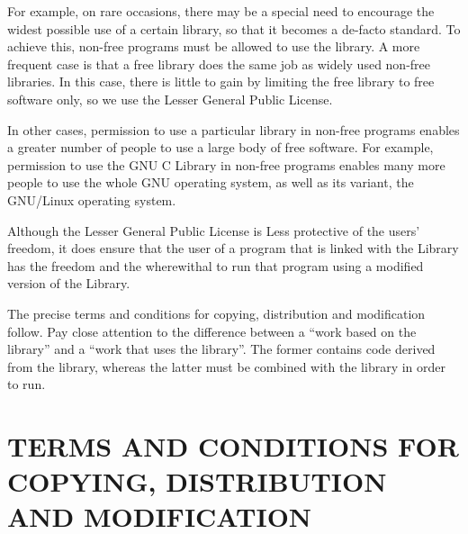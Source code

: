   For example, on rare occasions, there may be a special need to
encourage the widest possible use of a certain library, so that it becomes
a de-facto standard.  To achieve this, non-free programs must be
allowed to use the library.  A more frequent case is that a free
library does the same job as widely used non-free libraries.  In this
case, there is little to gain by limiting the free library to free
software only, so we use the Lesser General Public License.

  In other cases, permission to use a particular library in non-free
programs enables a greater number of people to use a large body of
free software.  For example, permission to use the GNU C Library in
non-free programs enables many more people to use the whole GNU
operating system, as well as its variant, the GNU/Linux operating
system.

  Although the Lesser General Public License is Less protective of the
users' freedom, it does ensure that the user of a program that is
linked with the Library has the freedom and the wherewithal to run
that program using a modified version of the Library.

  The precise terms and conditions for copying, distribution and
modification follow.  Pay close attention to the difference between a
``work based on the library'' and a ``work that uses the library''.  The
former contains code derived from the library, whereas the latter must
be combined with the library in order to run.

\section{TERMS AND CONDITIONS FOR COPYING, DISTRIBUTION AND MODIFICATION}

